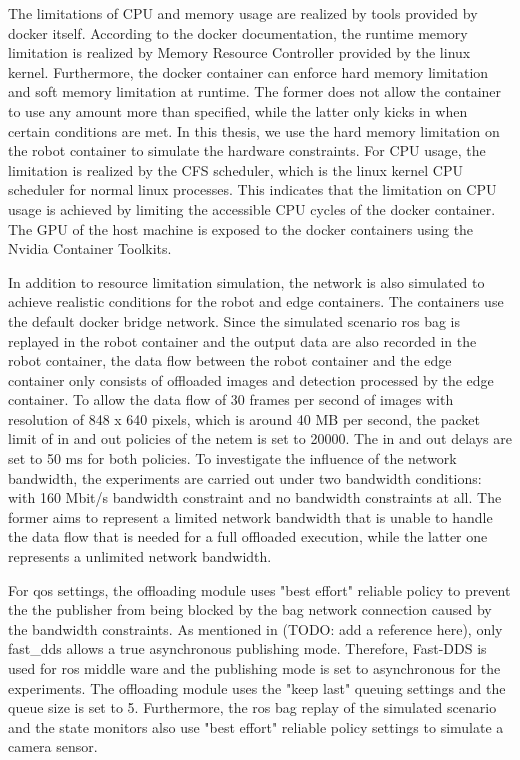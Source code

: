 The limitations of CPU and memory usage are realized by tools provided by \gls{docker} itself. According to the \gls{docker} documentation, the runtime memory limitation is realized by Memory Resource Controller provided by the \gls{linux} kernel. Furthermore, the \gls{docker} container can enforce hard memory limitation and soft memory limitation at runtime. The former does not allow the container to use any amount more than specified, while the latter only kicks in when certain conditions are met. In this thesis, we use the hard memory limitation on the robot container to simulate the hardware constraints. For CPU usage, the limitation is realized by the CFS scheduler, which is the \gls{linux} kernel CPU scheduler for normal \gls{linux} processes. This indicates that the limitation on CPU usage is achieved by limiting the accessible CPU cycles of the \gls{docker} container. The GPU of the host machine is exposed to the \gls{docker} containers using the Nvidia Container Toolkits.

In addition to resource limitation simulation, the network is also simulated to achieve realistic conditions for the robot and edge containers. The containers use the default \gls{docker} bridge network. Since the simulated scenario \gls{ros} bag is replayed in the robot container and the output data are also recorded in the robot container, the data flow between the robot container and the edge container only consists of offloaded images and detection processed by the edge container. To allow the data flow of 30 frames per second of images with resolution of 848 x 640 pixels, which is around 40 MB per second, the packet limit of in and out policies of the \gls{netem} is set to 20000. The in and out delays are set to 50 ms for both policies. To investigate the influence of the network bandwidth, the experiments are carried out under two bandwidth conditions: with 160 Mbit/s bandwidth constraint and no bandwidth constraints at all. The former aims to represent a limited network bandwidth that is unable to handle the data flow that is needed for a full offloaded execution, while the latter one represents a unlimited network bandwidth. 

For \gls{qos} settings, the offloading module uses "best effort" reliable policy to prevent the the publisher from being blocked by the bag network connection caused by the bandwidth constraints. As mentioned in (TODO: add a reference here), only \gls{fast_dds} allows a true asynchronous publishing mode. Therefore, Fast-DDS is used for \gls{ros} middle ware and the publishing mode is set to asynchronous for the experiments. The offloading module uses the "keep last" queuing settings and the queue size is set to 5. Furthermore, the \gls{ros} bag replay of the simulated scenario and the state monitors also use "best effort" reliable policy settings to simulate a camera sensor. 

